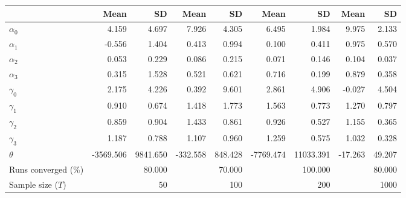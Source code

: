 
\begin{tabular}[t]{lrrrrrrrr}
\toprule
  & Mean & SD & Mean  & SD  & Mean   & SD   & Mean    & SD   \\
\midrule
$\alpha_{0}$ & 4.159 & 4.697 & 7.926 & 4.305 & 6.495 & 1.984 & 9.975 & 2.133\\
$\alpha_{1}$ & -0.556 & 1.404 & 0.413 & 0.994 & 0.100 & 0.411 & 0.975 & 0.570\\
$\alpha_{2}$ & 0.053 & 0.229 & 0.086 & 0.215 & 0.071 & 0.146 & 0.104 & 0.037\\
$\alpha_{3}$ & 0.315 & 1.528 & 0.521 & 0.621 & 0.716 & 0.199 & 0.879 & 0.358\\
$\gamma_{0}$ & 2.175 & 4.226 & 0.392 & 9.601 & 2.861 & 4.906 & -0.027 & 4.504\\
$\gamma_{1}$ & 0.910 & 0.674 & 1.418 & 1.773 & 1.563 & 0.773 & 1.270 & 0.797\\
$\gamma_{2}$ & 0.859 & 0.904 & 1.433 & 0.861 & 0.926 & 0.527 & 1.155 & 0.365\\
$\gamma_{3}$ & 1.187 & 0.788 & 1.107 & 0.960 & 1.259 & 0.575 & 1.032 & 0.328\\
$\theta$ & -3569.506 & 9841.650 & -332.558 & 848.428 & -7769.474 & 11033.391 & -17.263 & 49.207\\
Runs converged (\%) &  & 80.000 &  & 70.000 &  & 100.000 &  & 80.000\\
Sample size ($T$) &  & 50 &  & 100 &  & 200 &  & 1000\\
\bottomrule
\end{tabular}
